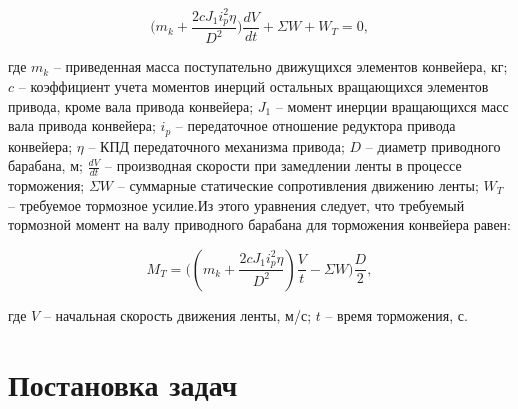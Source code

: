 $$ \Big( m_k + \frac{2cJ_1 i^2_p \eta}{D^2} \Big) \frac{dV}{dt} + \Sigma W + W_T = 0, $$

где $m_k$ -- приведенная масса поступательно движущихся элементов конвейера, кг; $c$ -- коэффициент учета моментов инерций остальных вращающихся элементов привода, кроме вала привода конвейера; $J_1$ -- момент инерции вращающихся масс вала привода конвейера; $i_p$ -- передаточное отношение редуктора привода конвейера; $\eta$ -- КПД передаточного механизма привода; $D$ -- диаметр приводного барабана, м; $\frac{dV}{dt}$ -- производная скорости при замедлении ленты в процессе торможения; $ \Sigma W $ -- суммарные статические сопротивления движению ленты; $W_T$ -- требуемое тормозное усилие.Из этого уравнения следует, что требуемый тормозной момент на валу приводного барабана для торможения конвейера равен:

$$ M_T = \Big( ( m_k + \frac{2cJ_1 i^2_p \eta}{D^2} )\frac{V}{t} - \Sigma W \Big) \frac{D}{2}, $$

где $V$ -- начальная скорость движения ленты, м/с; $t$ -- время торможения, с.

\section{Постановка задач} \label{sect1_2}

